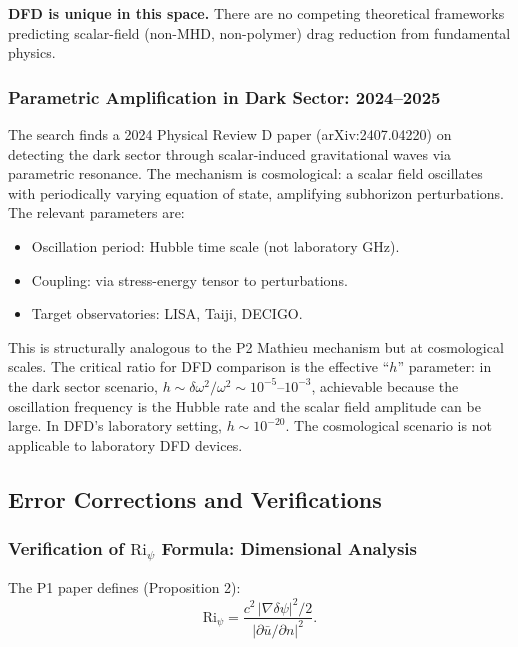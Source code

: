 \documentclass[11pt,twocolumn]{article}
\newcommand{\dpsi}{\delta\psi}
\newcommand{\Ri}{\mathrm{Ri}}
\begin{document}
\textbf{DFD is unique in this space.} There are no competing theoretical
frameworks predicting scalar-field (non-MHD, non-polymer) drag reduction
from fundamental physics.

\subsubsection{Parametric Amplification in Dark Sector: 2024--2025}

The search finds a 2024 Physical Review D paper (arXiv:2407.04220) on
detecting the dark sector through scalar-induced gravitational waves via
parametric resonance. The mechanism is cosmological: a scalar field
oscillates with periodically varying equation of state, amplifying
subhorizon perturbations. The relevant parameters are:
\begin{itemize}[noitemsep]
\item Oscillation period: Hubble time scale (not laboratory GHz).
\item Coupling: via stress-energy tensor to perturbations.
\item Target observatories: LISA, Taiji, DECIGO.
\end{itemize}

This is structurally analogous to the P2 Mathieu mechanism but at
cosmological scales. The critical ratio for DFD comparison is the
effective ``$h$'' parameter: in the dark sector scenario,
$h \sim \delta\omega^2/\omega^2 \sim 10^{-5}$--$10^{-3}$, achievable because
the oscillation frequency is the Hubble rate and the scalar field amplitude
can be large. In DFD's laboratory setting, $h \sim 10^{-20}$. The cosmological
scenario is not applicable to laboratory DFD devices.

\subsection{Error Corrections and Verifications}
\label{sec:errors}

\subsubsection{Verification of $\Ri_\psi$ Formula: Dimensional Analysis}

The P1 paper defines (Proposition 2):
\begin{equation}
\Ri_\psi = \frac{c^2\,|\nabla\dpsi|^2/2}{|\partial\bar{u}/\partial n|^2}.
\label{eq:ri_check}
\end{equation}
\end{document}
